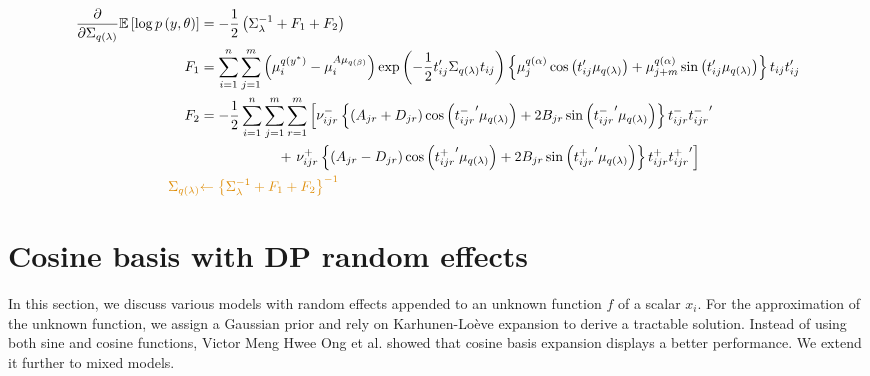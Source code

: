 \documentclass[11pt]{article}
\begin{document}
\begin{align*}
  \frac{\partial}{\partial \Sigma_{q\left(\lambda\right)}} \mathbb{E}\left[\log p\left(y, \theta\right) \right] &= -\frac{1}{2}\left(\Sigma_{\lambda}^{-1} + F_{1} + F_{2} \right)\\
  F_{1} &= \sum_{i=1}^{n}\sum_{j=1}^{m} \left(\mu_{i}^{q\left(y^{*}\right)} -\mu_{i}^{A\mu_{q\left(\beta\right)}}\right)\exp\left(-\frac{1}{2}t_{ij}'\Sigma_{q\left(\lambda\right)}t_{ij}\right)\left\{\mu_{j}^{q\left(\alpha\right)}\cos \left(t_{ij}'\mu_{q\left(\lambda\right)}\right) + \mu_{j+m}^{q\left(\alpha\right)}\sin \left(t_{ij}'\mu_{q\left(\lambda\right)}\right) \right\}t_{ij}t_{ij}'\\
  F_{2} &= -\frac{1}{2}\sum_{i=1}^{n}\sum_{j=1}^{m}\sum_{r=1}^{m} \left[\nu_{ijr}^{-}\left\{\left(A_{jr}+D_{jr}\right)\cos\left({t_{ijr}^{-}}'\mu_{q\left(\lambda\right)} \right) +2B_{jr}\sin\left({t_{ijr}^{-}}'\mu_{q\left(\lambda\right)} \right) \right\}t_{ijr}^{-}{t_{ijr}^{-}}'\right.\\
  &\quad\qquad \qquad\;\; +\left. \nu_{ijr}^{+}\left\{\left(A_{jr}-D_{jr} \right)\cos\left({t_{ijr}^{+}}'\mu_{q\left(\lambda\right)} \right) +2B_{jr}\sin\left({t_{ijr}^{+}}'\mu_{q\left(\lambda\right)} \right) \right\}t_{ijr}^{+}{t_{ijr}^{+}}' \right]\\
  \textcolor{myorange}{\Sigma_{q\left(\lambda\right)}} &\textcolor{myorange}{\leftarrow \left\{\Sigma_{\lambda}^{-1} + F_{1}+F_{2} \right\}^{-1}}
\end{align*}
\section{Cosine basis with DP random effects}
In this section, we discuss various models with random effects appended to an unknown function $f$ of a scalar $x_{i}$. For the approximation of the unknown function, we assign a Gaussian prior and rely on Karhunen-Loève expansion to derive a tractable solution. Instead of using both sine and cosine functions, Victor Meng Hwee Ong et al. showed that cosine basis expansion displays a better performance. We extend it further to mixed models.
\end{document}

